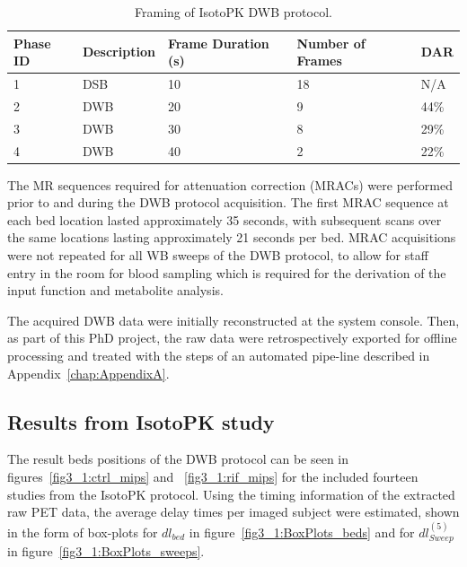 \begin{table}[h!]
\centering
\caption{Framing of IsotoPK DWB protocol.}
\label{tab:IsotoPK_Framing}
\begin{tabular}{|l|l|l|l|l|}
\toprule
\textbf{Phase ID} & \textbf{Description}              & \textbf{Frame Duration (s)} & \textbf{Number of Frames} & \textbf{DAR} \\
\midrule
1        & DSB & 10                 & 18        & N/A                 \\
2        & DWB                      & 20                 & 9         & 44\%                \\
3        & DWB                      & 30                 & 8         & 29\%                \\
4        & DWB                      & 40                 & 2         & 22\%                \\
\bottomrule
\end{tabular}
\end{table}

The MR sequences required for attenuation correction (MRACs) were performed prior to and during the DWB protocol acquisition. The first MRAC sequence at each bed location lasted approximately 35 seconds, with subsequent scans over the same locations lasting approximately 21 seconds per bed. MRAC acquisitions were not repeated for all WB sweeps of the DWB protocol, to allow for staff entry in the room for blood sampling which is required for the derivation of the input function and metabolite analysis. 

The acquired DWB data were initially reconstructed at the system console.
Then, as part of this PhD project, the raw data were retrospectively exported for offline processing and treated with the steps of an automated pipe-line described in Appendix~\ref{chap:AppendixA}.

\subsection{Results from IsotoPK study}

The result beds positions of the DWB protocol can be seen in figures~\ref{fig3_1:ctrl_mips} and ~\ref{fig3_1:rif_mips} for the included fourteen studies from the IsotoPK protocol.
Using the timing information of the extracted raw PET data, the average delay times per imaged subject were estimated, shown in the form of box-plots for $dl_{bed}$ in figure~\ref{fig3_1:BoxPlots_beds} and for $dl_{Sweep}^{(5)}$ in figure~\ref{fig3_1:BoxPlots_sweeps}.

